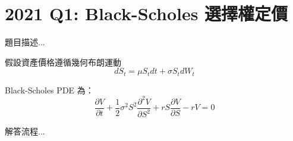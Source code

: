 \section{2021 Q1: Black-Scholes 選擇權定價}

題目描述...

假設資產價格遵循幾何布朗運動
\[
dS_t = \mu S_t dt + \sigma S_t dW_t
\]

Black-Scholes PDE 為：
\begin{equation}
\frac{\partial V}{\partial t} + \frac{1}{2} \sigma^2 S^2 \frac{\partial^2 V}{\partial S^2} + r S \frac{\partial V}{\partial S} - rV = 0
\end{equation}

解答流程...
